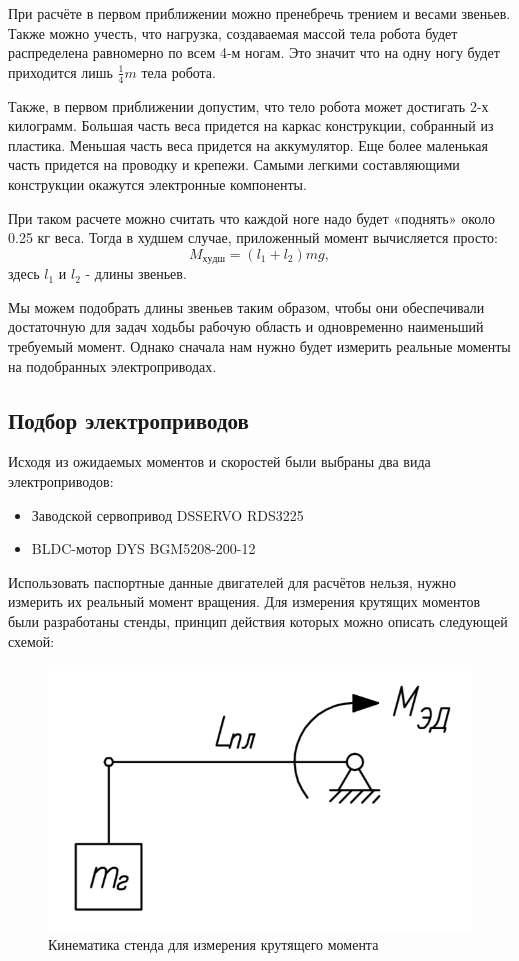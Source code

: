 При расчёте в первом приближении можно пренебречь трением и весами звеньев. Также можно учесть, что нагрузка, создаваемая массой тела робота будет распределена равномерно по всем 4-м ногам. Это значит что на одну ногу будет приходится лишь $\frac{1}{4}m$ тела робота.

Также, в первом приближении допустим, что тело робота может достигать 2-х килограмм. Большая часть веса придется на каркас конструкции, собранный из пластика. Меньшая часть веса придется на аккумулятор. Еще более маленькая часть придется на проводку и крепежи. Самыми легкими составляющими конструкции окажутся электронные компоненты.

При таком расчете можно считать что каждой ноге надо будет «поднять» около 0.25 кг веса. Тогда в худшем случае, приложенный момент вычисляется просто:
$$ M_{худш}=(l_{1}+l_{2}) m g, $$
\noindent здесь $l_1$ и $l_2$ - длины звеньев.

Мы можем подобрать длины звеньев таким образом, чтобы они обеспечивали достаточную для задач ходьбы рабочую область и одновременно наименьший требуемый момент. Однако сначала нам нужно будет измерить реальные моменты на подобранных электроприводах.

\subsection{Подбор электроприводов}

Исходя из ожидаемых моментов и скоростей были выбраны два вида электроприводов:

\begin{itemize}
    \item Заводской сервопривод DSSERVO RDS3225
    \item BLDC-мотор DYS BGM5208-200-12
\end{itemize}

Использовать паспортные данные двигателей для расчётов нельзя, нужно измерить их реальный момент вращения. Для измерения крутящих моментов были разработаны стенды, принцип действия которых можно описать следующей схемой:

\begin{figure}[ht]
    \centering
    \includegraphics[scale=0.7]{kin3.png}
    \caption{Кинематика стенда для измерения крутящего момента}
\end{figure}

